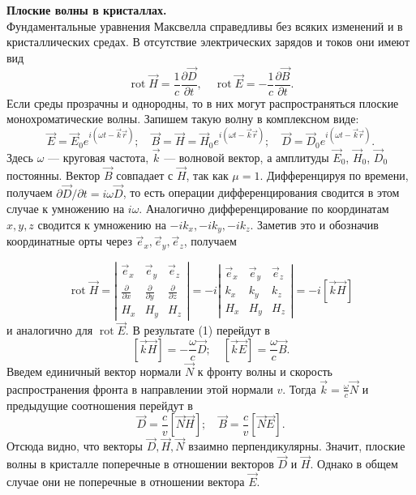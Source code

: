 \documentclass[a4paper, 12pt]{article}%
\begin{document}
	\noindent \textbf{Плоские волны в кристаллах.}\\
	Фундаментальные уравнения Максвелла справедливы без всяких изменений и в кристаллических средах. В отсутствие электрических зарядов и токов они имеют вид
	\begin{equation}
		\operatorname{rot} \vec{H}=\frac{1}{c} \frac{\partial \vec{D}}{\partial t}, \quad \operatorname{rot} \vec{E}=-\frac{1}{c} \frac{\partial \vec{B}}{\partial t}.
	\end{equation}
	Если среды прозрачны и однородны, то в них могут распространяться
	плоские монохроматические волны. Запишем такую волну в комплексном виде:
	\[
	\vec{E}=\vec{E}_{0} e^{i(\omega t-\vec{k} \vec{r})} ; \quad \vec{B}=\vec{H}=\vec{H}_{0} e^{i(\omega t-\vec{k} \vec{r})} ; \quad \vec{D}=\vec{D}_{0} e^{i(\omega t-\vec{k} \vec{r})}.
	\]
	Здесь $\omega$ --- круговая частота, $\vec k$ --- волновой вектор, а амплитуды $\vec E_0$, $\vec H_0$, $\vec D_0$ постоянны. Вектор $\vec B$ совпадает с $\vec H$, так как $\mu = 1$. Дифференцируя по времени, получаем $\partial \vec D / \partial t = i \omega \vec D$, то есть операции дифференцирования сводится в этом случае к умножению на $i \omega$. Аналогично дифференцирование по координатам $x, y, z$ сводится к умножению на $- i k_x, -i k_y, -i k_z$. Заметив это и обозначив координатные орты через $\vec e_x, \vec e_y, \vec e_z$, получаем
	
	\begin{equation*}
		\operatorname{rot} \vec{H}=\left|\begin{array}{ccc}
			\vec{e}_{x} & \vec{e}_{y} & \vec{e}_{z} \\
			\frac{\partial}{\partial x} & \frac{\partial}{\partial y} & \frac{\partial}{\partial z} \\
			H_{x} & H_{y} & H_{z}
		\end{array}\right|=-i\left|\begin{array}{ccc}
			\vec{e}_{x} & \vec{e}_{y} & \vec{e}_{z} \\
			k_{x} & k_{y} & k_{z} \\
			H_{x} & H_{y} & H_{z}
		\end{array}\right|=-i[\vec{k} \vec{H}]
	\end{equation*}
	и аналогично для $\operatorname{rot} \vec E $. В результате (1) перейдут в
	\[
	\left[ \vec k \vec H \right] = - \frac{\omega}{c} \vec D; \quad \left[ \vec k \vec E \right] = \frac{\omega}{c} \vec B.
	\]
	Введем единичный вектор нормали $\vec N$ к фронту волны и скорость распространения фронта в направлении этой нормали $v$. Тогда $\vec k = \frac{\omega}{c} \vec N$ и предыдущие соотношения перейдут в
	\begin{equation}
		\vec D = \frac{c}{v} \left[ \vec N \vec H \right]; \quad \vec B = \frac{c}{v} \left[ \vec N \vec E \right].
	\end{equation}
	Отсюда видно, что векторы $\vec D, \vec H, \vec N$ взаимно перпендикулярны. Значит, плоские волны в кристалле поперечные в отношении векторов $\vec D$ и $\vec H$. Однако в общем случае они не поперечные в отношении вектора $\vec E$.
	\newpage 
	
\end{document}
